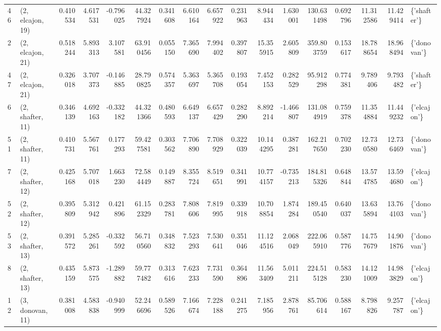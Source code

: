 \begin{tabular}{llrrrrrrrrrrrrrrl}
46 &  (2, elcajon, 19) &   0.410534 &   4.617531 & -0.796025 &   44.327924 &  0.341608 &   6.610164 &   6.657922 &  0.231963 &   8.944434 &   1.630001 &  130.631498 &  0.692796 &  11.312586 &  11.429414 &  \{'shafter'\} \\
2  &  (2, elcajon, 21) &   0.518244 &   5.893313 &  3.107581 &   63.910456 &  0.055150 &   7.365690 &   7.994402 &  0.397807 &  15.355915 &   2.605809 &  359.803759 &  0.153617 &  18.788654 &  18.968494 &  \{'donovan'\} \\
47 &  (2, elcajon, 21) &   0.326018 &   3.707373 & -0.146885 &   28.790825 &  0.574357 &   5.363697 &   5.365708 &  0.193054 &   7.452153 &   0.282529 &   95.912298 &  0.774381 &   9.789406 &   9.793482 &  \{'shafter'\} \\
6  &  (2, shafter, 11) &   0.346139 &   4.692163 & -0.332182 &   44.321366 &  0.480593 &   6.649137 &   6.657429 &  0.282290 &   8.892214 &  -1.466807 &  131.084919 &  0.759378 &  11.354884 &  11.449232 &  \{'elcajon'\} \\
51 &  (2, shafter, 11) &   0.410731 &   5.567761 &  0.177293 &   59.427581 &  0.303562 &   7.706890 &   7.708929 &  0.322039 &  10.144295 &   0.387281 &  162.217650 &  0.702230 &  12.730580 &  12.736469 &  \{'donovan'\} \\
7  &  (2, shafter, 12) &   0.425168 &   5.707018 &  1.663230 &   72.584449 &  0.149887 &   8.355724 &   8.519651 &  0.341991 &  10.774157 &  -0.735213 &  184.815326 &  0.648844 &  13.574785 &  13.594680 &  \{'elcajon'\} \\
52 &  (2, shafter, 12) &   0.395809 &   5.312942 &  0.421896 &   61.152329 &  0.283781 &   7.808606 &   7.819995 &  0.339918 &  10.708854 &   1.874284 &  189.450540 &  0.640037 &  13.635894 &  13.764103 &  \{'donovan'\} \\
53 &  (2, shafter, 13) &   0.391572 &   5.285261 & -0.332592 &   56.710560 &  0.348832 &   7.523293 &   7.530641 &  0.351046 &  11.124516 &   2.068049 &  222.065910 &  0.587776 &  14.757679 &  14.901876 &  \{'donovan'\} \\
8  &  (2, shafter, 13) &   0.435159 &   5.873575 & -1.289882 &   59.777482 &  0.313616 &   7.623233 &   7.731590 &  0.364896 &  11.563409 &   5.011211 &  224.515128 &  0.583230 &  14.121009 &  14.983829 &  \{'elcajon'\} \\
12 &  (3, donovan, 11) &   0.381008 &   4.583838 & -0.940999 &   52.246696 &  0.589526 &   7.166674 &   7.228188 &  0.241275 &   7.185956 &   2.878761 &   85.706614 &  0.588167 &   8.798826 &   9.257787 &  \{'elcajon'\} \\

\end{tabular}
